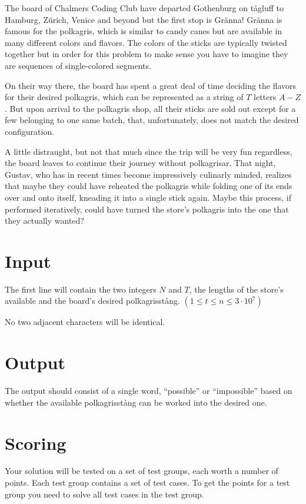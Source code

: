 \noindent

The board of Chalmers Coding Club have departed Gothenburg on tågluff to Hamburg, Zürich, Venice and
beyond but the first stop is Gränna! Gränna is famous for the polkagris, which is similar to candy
canes but are available in many different colors and flavors. The colors of the sticks are typically
twisted together but in order for this problem to make sense you have to imagine they are sequences
of single-colored segments.

On their way there, the board has spent a great deal of time deciding the flavors for their desired
polkagris, which can be represented as a string of $T$ letters $A-Z$. But upon arrival to the
polkagris shop, all their sticks are sold out except for a few belonging to one same batch, that,
unfortunately, does not match the desired configuration.

A little distraught, but not that much since the trip will be very fun regardless, the board leaves
to continue their journey without polkagrisar. That night, Gustav, who has in recent times become
impressively culinarly minded, realizes that maybe they could have reheated the polkagris while
folding one of its ends over and onto itself, kneading it into a single stick again. Maybe this
process, if performed iteratively, could have turned the store's polkagris into the one that they
actually wanted?

\section*{Input}

The first line will contain the two integers $N$ and $T$, the lengths of the store's available and
the board's desired polkagrisstång. $(1 \leq t \leq n \leq 3 \cdot 10^7)$

No two adjacent characters will be identical.

\section*{Output}

The output should consist of a single word, ``possible'' or ``impossible'' based on whether the
available polkagrisstång can be worked into the desired one.

\section*{Scoring}
Your solution will be tested on a set of test groups, each worth a number of points. Each test group contains
a set of test cases. To get the points for a test group you need to solve all test cases in the test group.

